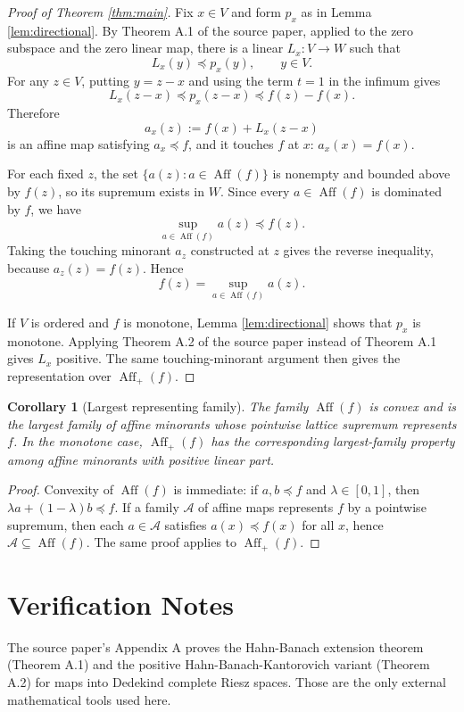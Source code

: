 \documentclass[11pt]{article}
\newtheorem{corollary}{Corollary}
\newcommand{\Aff}{\operatorname{Aff}}
\begin{document}
\begin{proof}[Proof of Theorem \ref{thm:main}]
Fix $x\in V$ and form $p_x$ as in Lemma \ref{lem:directional}. By Theorem A.1
of the source paper, applied to the zero subspace and the zero linear map,
there is a linear $L_x:V\to W$ such that
\[
  L_x(y)\preceq p_x(y),\qquad y\in V.
\]
For any $z\in V$, putting $y=z-x$ and using the term $t=1$ in the infimum gives
\[
  L_x(z-x)\preceq p_x(z-x)\preceq f(z)-f(x).
\]
Therefore
\[
  a_x(z):=f(x)+L_x(z-x)
\]
is an affine map satisfying $a_x\preceq f$, and it touches $f$ at $x$:
$a_x(x)=f(x)$.

For each fixed $z$, the set $\{a(z):a\in\Aff(f)\}$ is nonempty and bounded
above by $f(z)$, so its supremum exists in $W$. Since every $a\in\Aff(f)$ is
dominated by $f$, we have
\[
  \sup_{a\in\Aff(f)}a(z)\preceq f(z).
\]
Taking the touching minorant $a_z$ constructed at $z$ gives the reverse
inequality, because $a_z(z)=f(z)$. Hence
\[
  f(z)=\sup_{a\in\Aff(f)}a(z).
\]

If $V$ is ordered and $f$ is monotone, Lemma \ref{lem:directional} shows that
$p_x$ is monotone. Applying Theorem A.2 of the source paper instead of Theorem
A.1 gives $L_x$ positive. The same touching-minorant argument then gives the
representation over $\Aff_+(f)$.
\end{proof}

\begin{corollary}[Largest representing family]\label{cor:largest}
The family $\Aff(f)$ is convex and is the largest family of affine minorants
whose pointwise lattice supremum represents $f$. In the monotone case,
$\Aff_+(f)$ has the corresponding largest-family property among affine
minorants with positive linear part.
\end{corollary}

\begin{proof}
Convexity of $\Aff(f)$ is immediate: if $a,b\preceq f$ and
$\lambda\in[0,1]$, then $\lambda a+(1-\lambda)b\preceq f$. If a family
$\mathcal A$ of affine maps represents $f$ by a pointwise supremum, then each
$a\in\mathcal A$ satisfies $a(x)\preceq f(x)$ for all $x$, hence
$\mathcal A\subseteq\Aff(f)$. The same proof applies to $\Aff_+(f)$.
\end{proof}

\section*{Verification Notes}

The source paper's Appendix A proves the Hahn-Banach extension theorem
(Theorem A.1) and the positive Hahn-Banach-Kantorovich variant (Theorem A.2)
for maps into Dedekind complete Riesz spaces. Those are the only external
mathematical tools used here.
\end{document}
